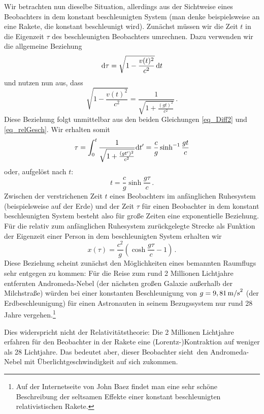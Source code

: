 Wir betrachten nun dieselbe Situation, allerdings
aus der Sichtweise eines
Beobachters in dem konstant beschleunigten
System (man denke beispielsweise an eine
Rakete, die konstant beschleunigt wird).
Zun\"achst m\"ussen wir die Zeit $t$
in die Eigenzeit $\tau$ des beschleunigten Beobachters
umrechnen. Dazu verwenden wir die
allgemeine Beziehung
\begin{equation} 
   {\rm d} \tau = \sqrt{1-\frac{v(t)^2}{c^2}} \, {\rm d}t
\end{equation}
und nutzen nun aus, dass
\begin{equation} 
   \sqrt{1-\frac{v(t)^2}{c^2}} = \frac{1}{\sqrt{1+\frac{(gt)^2}{c^2}}} \, .
\end{equation}
Diese Beziehung folgt unmittelbar aus den
beiden Gleichungen \ref{eq_Diff2} und \ref{eq_relGesch}.
Wir erhalten somit
\begin{equation}
   \tau = \int_0^t \frac{1}{\sqrt{1+\frac{(gt')^2}{c^2}}} {\rm d}t'
    = \frac{c}{g} \sinh^{-1} \frac{gt}{c} 
\end{equation}
oder, aufgel\"ost nach $t$:
\begin{equation}
      t = \frac{c}{g} \sinh \frac{g\tau}{c} \, .
\end{equation}
Zwischen der verstrichenen Zeit $t$ eines Beobachters
im anf\"anglichen Ruhesystem (beispielsweise auf
der Erde) und der Zeit $\tau$ f\"ur einen Beobachter in dem konstant
beschleunigten System besteht also f\"ur gro\ss e
Zeiten eine exponentielle Beziehung. F\"ur die
relativ zum anf\"anglichen Ruhesystem zur\"uckgelegte
Strecke als Funktion der Eigenzeit einer Person in
 dem beschleunigten System erhalten wir
 \begin{equation}
       x(\tau) = \frac{c^2}{g} \left( \cosh \frac{g \tau}{c} - 1 \right) \, .
 \end{equation}
Diese Beziehung scheint zun\"achst den
M\"oglichkeiten eines bemannten Raumflugs
sehr entgegen zu kommen: F\"ur die Reise zum 
rund 2 Millionen Lichtjahre entfernten Andro\-meda-Nebel
(der n\"achsten gro\ss en Galaxie au\ss erhalb der
Milchstra\ss e) w\"urden bei einer konstanten
Beschleunigung von $g=9,81\,{\rm m/s}^2$ (der 
Erdbeschleunigung) f\"ur einen Astronauten
in seinem Bezugssystem nur rund 28 Jahre
vergehen.\footnote{Auf der Internetseite
von John Baez \cite{Baez}
findet man eine sehr sch\"one Beschreibung der
seltsamen Effekte einer konstant beschleunigten
relativistischen Rakete.} 

Dies widerspricht nicht der Relativit\"atstheorie:
Die 2 Millionen Lichtjahre erfahren f\"ur den
Beobachter in der Rakete eine (Lorentz-)Kontraktion auf
weniger als 28 Lichtjahre. Das bedeutet aber, dieser
Beobachter \glqq sieht\grqq\ den Andromeda-Nebel
mit \"Uberlichtge\-schwindigkeit auf sich zukommen.

